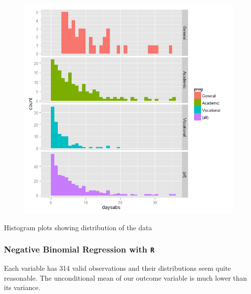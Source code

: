 \documentclass[MASTER.tex]{subfiles}
\begin{document}
\begin{frame}
\begin{figure}
\centering
\includegraphics[width=0.89\linewidth]{negbin1}
\end{figure}
Histogram plots showing distribution of the data
\end{frame}
\begin{frame}[fragile]
	\frametitle{Negative Binomial Regression with \texttt{R} }
	\Large


Each variable has 314 valid observations and their distributions seem quite reasonable. 
The unconditional mean of our outcome variable is much lower than its variance.
\end{frame}
\end{document}
